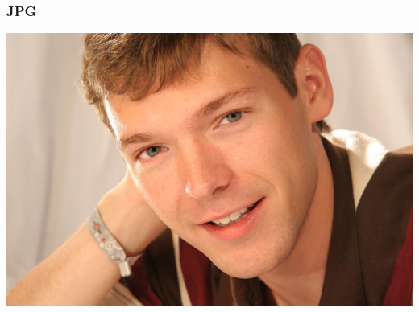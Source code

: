 \begin{frame}
  \frametitle{JPG}
  \begin{center}
    \includegraphics{5075}
  \end{center}
\end{frame}


